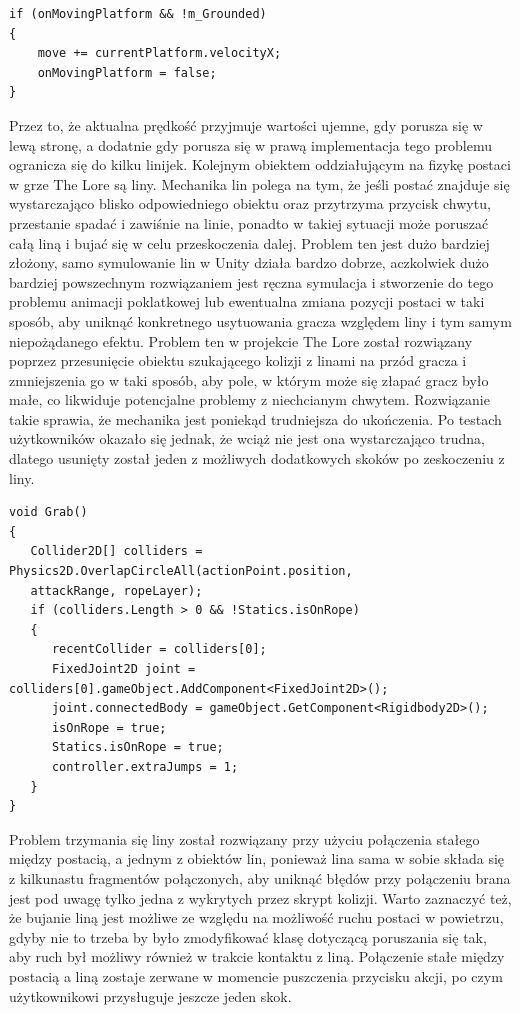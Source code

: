 \documentclass[oneside,polski,logo]{amuthesis}
\begin{document}
\begin{lstlisting}[breaklines=true,
language={[Sharp]C},
rulecolor=\color{blue!80!black},
caption={Fragment klasy \texttt{PlayerMovement.cs}}
]
if (onMovingPlatform && !m_Grounded)
{
	move += currentPlatform.velocityX;
	onMovingPlatform = false;
}
\end{lstlisting}
Przez to, że aktualna prędkość przyjmuje wartości ujemne, gdy porusza się w lewą stronę, a dodatnie gdy porusza się w prawą implementacja tego problemu ogranicza się do kilku linijek.
Kolejnym obiektem oddziałującym na fizykę postaci w grze The Lore są liny. Mechanika lin polega na tym, że jeśli postać znajduje się wystarczająco blisko odpowiedniego obiektu oraz przytrzyma przycisk chwytu, przestanie spadać i zawiśnie na linie, ponadto w takiej sytuacji może poruszać całą liną i bujać się w celu przeskoczenia dalej. Problem ten jest dużo bardziej złożony, samo symulowanie lin w Unity działa bardzo dobrze, aczkolwiek dużo bardziej powszechnym rozwiązaniem jest ręczna symulacja i stworzenie do tego problemu animacji poklatkowej lub ewentualna zmiana pozycji postaci w taki sposób, aby uniknąć konkretnego usytuowania gracza względem liny i tym samym niepożądanego efektu. Problem ten w projekcie The Lore został rozwiązany poprzez przesunięcie obiektu szukającego kolizji z linami na przód gracza i zmniejszenia go w taki sposób, aby pole, w którym może się złapać gracz było małe, co likwiduje potencjalne problemy z niechcianym chwytem. Rozwiązanie takie sprawia, że mechanika jest poniekąd trudniejsza do ukończenia. Po testach użytkowników okazało się jednak, że wciąż nie jest ona wystarczająco trudna, dlatego usunięty został jeden z możliwych dodatkowych skoków po zeskoczeniu z liny.
\newpage
\begin{lstlisting}[breaklines=true,
language={[Sharp]C},
rulecolor=\color{blue!80!black},
caption={Fragment klasy \texttt{PlayerMovement.cs}}
]    
void Grab()
{
   Collider2D[] colliders = Physics2D.OverlapCircleAll(actionPoint.position,
   attackRange, ropeLayer);
   if (colliders.Length > 0 && !Statics.isOnRope)
   {
      recentCollider = colliders[0];
      FixedJoint2D joint = colliders[0].gameObject.AddComponent<FixedJoint2D>();
      joint.connectedBody = gameObject.GetComponent<Rigidbody2D>();
      isOnRope = true;
      Statics.isOnRope = true;
      controller.extraJumps = 1;
   }
}
\end{lstlisting}

Problem trzymania się liny został rozwiązany przy użyciu połączenia stałego między postacią, a jednym z obiektów lin, ponieważ lina sama w sobie składa się z kilkunastu fragmentów połączonych, aby uniknąć błędów przy połączeniu brana jest pod uwagę tylko jedna z wykrytych przez skrypt kolizji. Warto zaznaczyć też, że bujanie liną jest możliwe ze względu na możliwość ruchu postaci w powietrzu, gdyby nie to trzeba by było zmodyfikować klasę dotyczącą poruszania się tak, aby ruch był możliwy również w trakcie kontaktu z liną. Połączenie stałe między postacią a liną zostaje zerwane w momencie puszczenia przycisku akcji, po czym użytkownikowi przysługuje jeszcze jeden skok.
\end{document}
